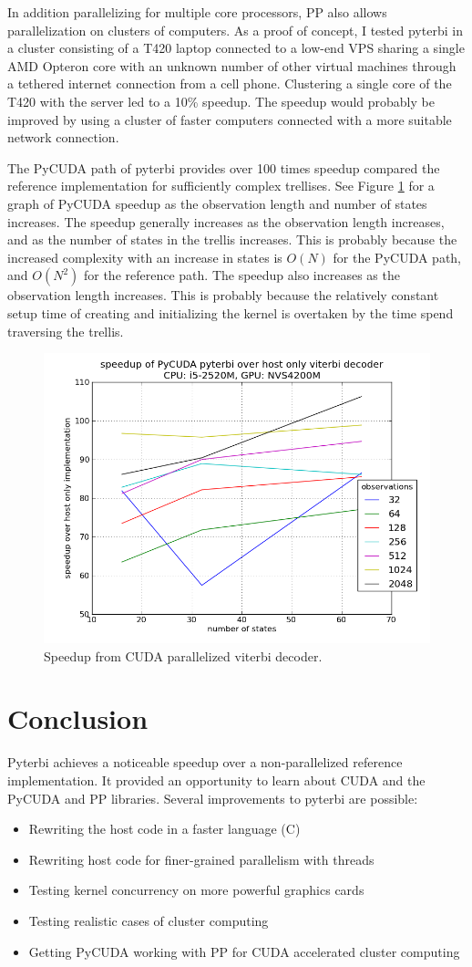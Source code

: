 \documentclass[journal,onecolumn]{IEEEtran}
\begin{document}
In addition parallelizing for multiple core processors, PP also allows parallelization on clusters of computers. As a proof of concept, I tested pyterbi in a cluster consisting of a T420 laptop connected to a low-end VPS sharing a single AMD Opteron core with an unknown number of other virtual machines through a tethered internet connection from a cell phone. Clustering a single core of the T420 with the server led to a 10\% speedup. The speedup would probably be improved by using a cluster of faster computers connected with a more suitable network connection.

The PyCUDA path of pyterbi provides over 100 times speedup compared the reference implementation for sufficiently complex trellises. See Figure \ref{fig_rcuda} for a graph of PyCUDA speedup as the observation length and number of states increases. The speedup generally increases as the observation length increases, and as the number of states in the trellis increases. This is probably because the increased complexity with an increase in states is $O(N)$ for the PyCUDA path, and $O(N^2)$ for the reference path. The speedup also increases as the observation length increases. This is probably because the relatively constant setup time of creating and initializing the kernel is overtaken by the time spend traversing the trellis.

\begin{figure}[!t]
    \centering
    \includegraphics[width=.5 \linewidth]{figures/speedupgraphcuda.png}
    \caption{Speedup from CUDA parallelized viterbi decoder.}
    \label{fig_rcuda}
\end{figure}


\section{Conclusion}
Pyterbi achieves a noticeable speedup over a non-parallelized reference implementation. It provided an opportunity to learn about CUDA and the PyCUDA and PP libraries. 
Several improvements to pyterbi are possible:
\begin{itemize}
    \item Rewriting the host code in a faster language (C)
    \item Rewriting host code for finer-grained parallelism with threads
    \item Testing kernel concurrency on more powerful graphics cards
    \item Testing realistic cases of cluster computing
    \item Getting PyCUDA working with PP for CUDA accelerated cluster computing 
\end{itemize}
\end{document}
